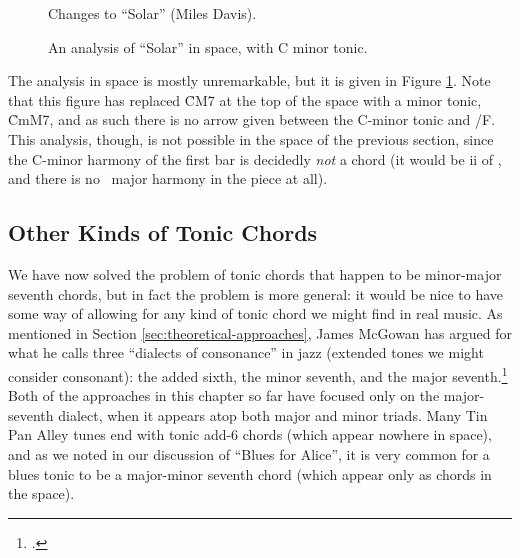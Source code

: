 \begin{figure}[tp]
  \caption{Changes to ``Solar'' (Miles Davis).}
  \label{tfe:solar-changes}

  \vspace{4em}

  \caption{An analysis of ``Solar'' in \tf space, with C minor tonic.}
  \label{tfe:solar-space}
\end{figure}

The analysis in \tf space is mostly unremarkable, but it is given in Figure
\ref{tfe:solar-space}. Note that this figure has replaced \h{CM7} at the top
of the space with a minor tonic, \h{CmM7}, and as such there is no arrow given
between the C-minor tonic and \V/F. This analysis, though, is not
possible in the \tf space of the previous section, since the C-minor harmony
of the first bar is decidedly \emph{not} a \ii chord (it would be ii of
\Bflat, and there is no \Bflat\ major harmony in the piece at all).



\FloatBarrier
\subsection{Other Kinds of Tonic Chords}
\label{sec:other-kinds-tonic}

We have now solved the problem of tonic chords that happen to be minor-major
seventh chords, but in fact the problem is more general: it would be nice to
have some way of allowing for any kind of tonic chord we might find in real
music. As mentioned in Section \ref{sec:theoretical-approaches}, James McGowan
has argued for what he calls three ``dialects of consonance'' in jazz
(extended tones we might consider consonant): the added sixth, the minor
seventh, and the major seventh.\footcite[76--79]{mcgowan:2005} Both of the
approaches in this chapter so far have focused only on the major-seventh
dialect, when it appears atop both major and minor triads. Many Tin Pan Alley
tunes end with tonic add-6 chords (which appear nowhere in \tf space), and as
we noted in our discussion of ``Blues for Alice'', it is very common for a
blues tonic to be a major-minor seventh chord (which appear only as \V chords
in the space).

